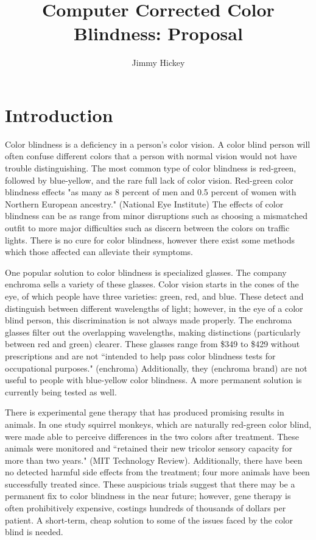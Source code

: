 \documentclass[12pt]{article}
\title{
Computer Corrected Color Blindness: Proposal
}
\author{Jimmy Hickey}
\begin{document}
\maketitle
\doublespacing


\section{Introduction}

Color blindness is a deficiency in a person's color vision. A color blind person will often confuse different colors that a person with normal vision would not have trouble distinguishing. The most common type of color blindness is red-green, followed by blue-yellow, and the rare full lack of color vision. Red-green color blindness effects "as many as 8 percent of men and 0.5 percent of women with Northern European ancestry." (National Eye Institute) The effects of color blindness can be as range from minor disruptions such as choosing a mismatched outfit to more major difficulties such as discern between the colors on traffic lights.
There is no cure for color blindness, however there exist some methods which those affected can alleviate their symptoms. 

One popular solution to color blindness is specialized glasses. The company enchroma sells a variety of these glasses. Color vision starts in the cones of the eye, of which people have three varieties: green, red, and blue. These detect and distinguish between different wavelengths of light; however, in the eye of a color blind person, this discrimination is not always made properly. The enchroma glasses filter out the overlapping wavelengths, making distinctions (particularly between red and green) clearer. These glasses range from \$349 to \$429 without prescriptions and are not ``intended to help pass color blindness tests for occupational purposes." (enchroma) Additionally, they (enchroma brand) are not useful to people with blue-yellow color blindness. A more permanent solution is currently being tested as well.

There is experimental gene therapy that has produced promising results in animals. In one study squirrel monkeys, which are naturally red-green color blind, were made able to perceive differences in the two colors after treatment. These animals were monitored and ``retained their new tricolor sensory capacity for more than two years." (MIT Technology Review). Additionally, there have been no detected harmful side effects from the treatment; four more animals have been successfully treated since. These auspicious trials suggest that there may be a permanent fix to color blindness in the near future; however, gene therapy is often prohibitively expensive, costings hundreds of thousands of dollars per patient. A short-term, cheap solution to some of the issues faced by the color blind is needed. 
\end{document}
